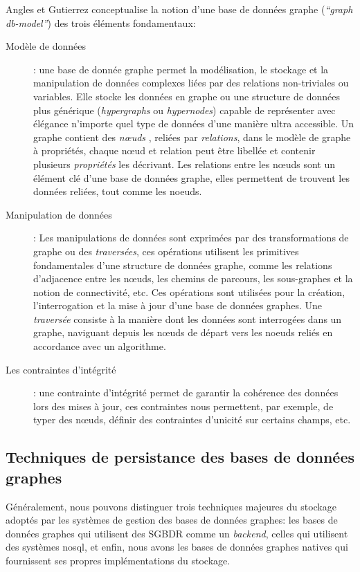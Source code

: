   Angles et Gutierrez \cite{angles2008survey} conceptualise la notion
  d'une base de données graphe (\textit{``graph db-model''}) des trois
  éléments fondamentaux:\medskip
  \newpage
  \renewcommand{\descriptionlabel}[1]{\hspace{1cm}\textbullet~\textsf{#1}}
  \begin{description}
  \item [Modèle de données]: une base de donnée graphe permet la
    modélisation, le stockage et la manipulation de données complexes
    liées par des relations non-triviales ou variables. Elle stocke
    les données en graphe ou une structure de données plus générique
    (\textit{hypergraphs} ou \textit{hypernodes}) capable de
    représenter avec élégance n'importe quel type de données d'une
    manière ultra accessible. Un graphe contient des \textit{nœuds} ,
    reliées par \textit{relations}, dans le modèle de graphe à
    propriétés, chaque nœud et relation peut être libellée et contenir
    plusieurs \textit{propriétés} les décrivant. Les relations entre
    les nœuds sont un élément clé d'une base de données graphe, elles
    permettent de trouvent les données reliées, tout comme les
    noeuds.\medskip

  \item [Manipulation de données]: Les manipulations de données sont
    exprimées par des transformations de graphe ou des
    \textit{traversées}, ces opérations utilisent les primitives
    fondamentales d'une structure de données graphe, comme les
    relations d'adjacence entre les nœuds, les chemins de parcours,
    les sous-graphes et  la notion de connectivité, etc. Ces opérations
    sont utilisées pour la création, l'interrogation et la mise à jour
    d'une base de données graphes. Une \textit{traversée} consiste à
    la manière dont les données sont interrogées dans un graphe,
    naviguant depuis les nœuds de départ vers les noeuds reliés en
    accordance avec un algorithme.\medskip

  \item [Les contraintes d'intégrité]: une contrainte d'intégrité
    permet de garantir la cohérence des données lors des mises à jour,
    ces contraintes nous permettent, par exemple, de typer des nœuds,
    définir des contraintes d'unicité sur certains champs, etc.
  \end{description}
\enddescription

  \subsection{Techniques de persistance des bases de données graphes}
  \label{sec:persistence}
  Généralement, nous pouvons distinguer trois techniques majeures du
  stockage adoptés par les systèmes de gestion des bases de données
  graphes: les bases de données graphes qui utilisent des
  \acrshort{SGBDR} comme un \emph{backend}, celles qui utilisent des
  systèmes \acrshort{nosql}, et enfin, nous avons les bases de données
  graphes natives qui fournissent ses propres implémentations du
  stockage.

